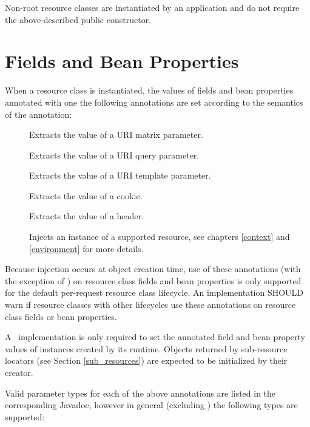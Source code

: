 Non-root resource classes are instantiated by an application and do not require the above-described public constructor.

\section{Fields and Bean Properties}
\label{resource_field}

When a resource class is instantiated, the values of fields and bean properties annotated with one the following annotations are set according to the semantics of the annotation:

\begin{description}
\item[\MatrixParam] Extracts the value of a URI matrix parameter.
\item[\QueryParam] Extracts the value of a URI query parameter.
\item[\PathParam] Extracts the value of a URI template parameter.
\item[\CookieParam] Extracts the value of a cookie.
\item[\HeaderParam] Extracts the value of a header.
\item[\Context] Injects an instance of a supported resource, see chapters \ref{context} and \ref{environment} for more details.
\end{description}

Because injection occurs at object creation time, use of these annotations (with the exception of \Context) on resource class fields and bean properties is only supported for the default per-request resource class lifecycle. An implementation SHOULD warn if resource classes with other lifecycles use these annotations on resource class fields or bean properties.

A \jaxrs\ implementation is only required to set the annotated field and bean property values of instances created by its runtime. Objects returned by sub-resource locators (see Section \ref{sub_resources}) are expected to be initialized by their creator.

Valid parameter types for each of the above annotations are listed in the corresponding Javadoc, however in general (excluding \Context) the following types are supported:

